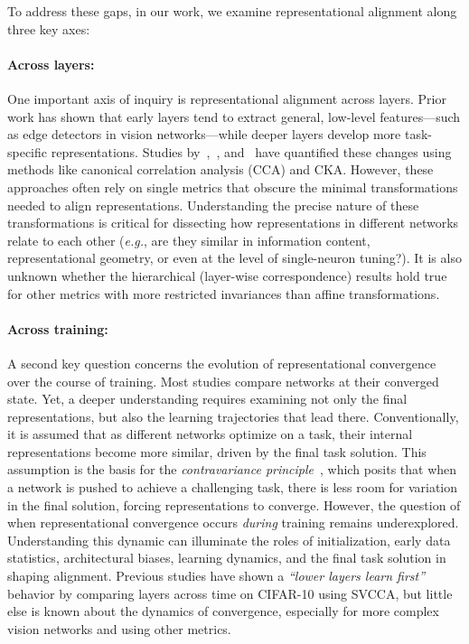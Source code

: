 To address these gaps, in our work, we examine representational alignment along three key axes: 
\paragraph{Across layers:} One important axis of inquiry is representational alignment across layers. Prior work has shown that early layers tend to extract general, low-level features---such as edge detectors in vision networks---while deeper layers develop more task-specific representations. Studies by~\citep{kornblith2019similarity},~\citep{mehrer2020individual}, and~\citep{li2015convergent} have quantified these changes using methods like canonical correlation analysis (CCA) and CKA. However, these approaches often rely on single metrics that obscure the minimal transformations needed to align representations. Understanding the precise nature of these transformations is critical for dissecting how representations in different networks relate to each other (\emph{e.g.}, are they similar in information content, representational geometry, or even at the level of single-neuron tuning?). It is also unknown whether the hierarchical (layer-wise correspondence) results hold true for other metrics with more restricted invariances than affine transformations.

\paragraph{Across training:} A second key question concerns the evolution of representational convergence over the course of training. Most studies compare networks at their converged state. Yet, a deeper understanding requires examining not only the final representations, but also the learning trajectories that lead there. Conventionally, it is assumed that as different networks optimize on a task, their internal representations become more similar, driven by the final task solution. This assumption is the basis for the \emph{contravariance principle}~\citep{cao2021explanatory}, which posits that when a network is pushed to achieve a challenging task, there is less room for variation in the final solution, forcing representations to converge. However, the question of when representational convergence occurs \emph{during} training remains underexplored. Understanding this dynamic can illuminate the roles of initialization, early data statistics, architectural biases, learning dynamics, and the final task solution in shaping alignment. Previous studies have shown a \emph{``lower layers learn first''}~\citep{raghu2017svcca} behavior by comparing layers across time on CIFAR-10 using SVCCA, but little else is known about the dynamics of convergence, especially for more complex vision networks and using other metrics. 

